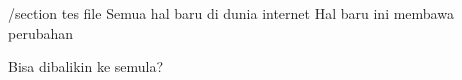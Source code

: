 /section tes file
	Semua hal baru di dunia internet
Hal baru ini membawa perubahan

Bisa dibalikin ke semula?